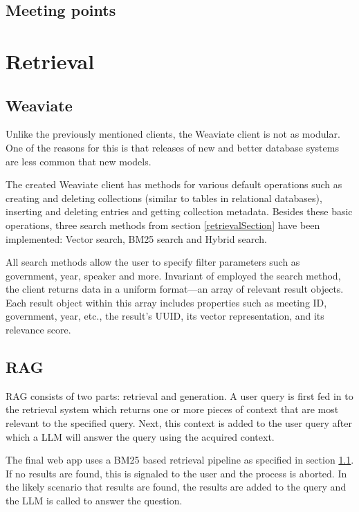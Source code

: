 \documentclass[twoside]{uva-inf-bachelor-thesis}
\begin{document}

\subsection{Meeting points}

\section{Retrieval}
\subsection{Weaviate}\label{sec:weaviate}
Unlike the previously mentioned clients, the Weaviate client is not as modular. One of the reasons for this is that releases of new and better database systems are less common that new models. 

The created Weaviate client has methods for various default operations such as creating and deleting collections (similar to tables in relational databases), inserting and deleting entries and getting collection metadata. Besides these basic operations, three search methods from section \ref{retrievalSection} have been implemented: Vector search, BM25 search and Hybrid search.

All search methods allow the user to specify filter parameters such as government, year, speaker and more. Invariant of employed the search method, the client returns data in a uniform format—an array of relevant result objects. Each result object within this array includes properties such as meeting ID, government, year, etc., the result's UUID, its vector representation, and its relevance score.

\subsection{RAG}
RAG consists of two parts: retrieval and generation. A user query is first fed in to the retrieval system which returns one or more pieces of context that are most relevant to the specified query. Next, this context is added to the user query after which a LLM will answer the query using the acquired context. 

The final web app uses a BM25 based retrieval pipeline as specified in section \ref{sec:weaviate}. If no results are found, this is signaled to the user and the process is aborted. In the likely scenario that results are found, the results are added to the query and the LLM is called to answer the question.
\end{document}
